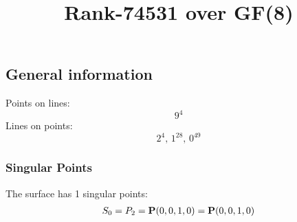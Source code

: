 \documentclass{article}
\newcommand\setTBstruts{\def\T{\rule{0pt}{2.6ex}}%
\def\B{\rule[-1.2ex]{0pt}{0pt}}}
\newcommand{\bP}{{\bf P}}
\begin{document}
 
\setTBstruts



{\allowdisplaybreaks%






\title{Rank-74531 over GF(8)}
\author{}%
\maketitle%
%
{}



\subsection*{General information}
Points on lines:
$$
9^4$$
Lines on points:
$$
2^4,\,1^{28},\,0^{49}$$
\subsubsection*{Singular Points}
The surface has 1 singular points:\\
\begin{align*}
S_{0} &= P_{2}=\bP(0, 0, 1, 0) = \bP(0, 0, 1, 0)\\
\end{align*}
}
\end{document}
